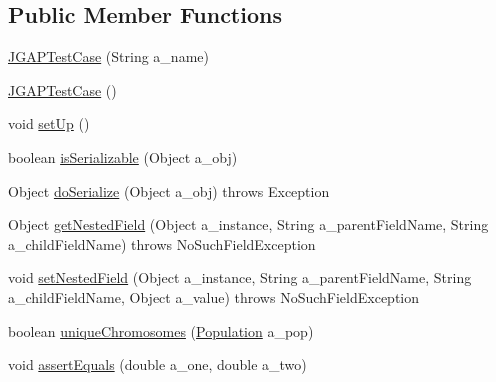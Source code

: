 \subsection*{Public Member Functions}
\begin{DoxyCompactItemize}
\item 
\hyperlink{classorg_1_1jgap_1_1_j_g_a_p_test_case_adf378e0444b264c507f8cc459d8a26ee}{J\-G\-A\-P\-Test\-Case} (String a\-\_\-name)
\item 
\hyperlink{classorg_1_1jgap_1_1_j_g_a_p_test_case_a472f2e2903439a8a484ba5ff0639fa02}{J\-G\-A\-P\-Test\-Case} ()
\item 
void \hyperlink{classorg_1_1jgap_1_1_j_g_a_p_test_case_a7278f46bafa651d39a1d301f6edacece}{set\-Up} ()
\item 
boolean \hyperlink{classorg_1_1jgap_1_1_j_g_a_p_test_case_a29296ff97e1d62bc9fd84f8571d3e654}{is\-Serializable} (Object a\-\_\-obj)
\item 
Object \hyperlink{classorg_1_1jgap_1_1_j_g_a_p_test_case_ac979f355528f40c594bf83535f3925b8}{do\-Serialize} (Object a\-\_\-obj)  throws Exception 
\item 
Object \hyperlink{classorg_1_1jgap_1_1_j_g_a_p_test_case_a1068930066ebd33ed69ccfe34a7f78ed}{get\-Nested\-Field} (Object a\-\_\-instance, String a\-\_\-parent\-Field\-Name, String a\-\_\-child\-Field\-Name)  throws No\-Such\-Field\-Exception 
\item 
void \hyperlink{classorg_1_1jgap_1_1_j_g_a_p_test_case_a77399f44cc0bd6e5ac3832e0ad2b2f7e}{set\-Nested\-Field} (Object a\-\_\-instance, String a\-\_\-parent\-Field\-Name, String a\-\_\-child\-Field\-Name, Object a\-\_\-value)  throws No\-Such\-Field\-Exception 
\item 
boolean \hyperlink{classorg_1_1jgap_1_1_j_g_a_p_test_case_a653121052ecd3600acbcabf78dc1e193}{unique\-Chromosomes} (\hyperlink{classorg_1_1jgap_1_1_population}{Population} a\-\_\-pop)
\item 
void \hyperlink{classorg_1_1jgap_1_1_j_g_a_p_test_case_a55e45761cdd59a4489404bb7aa775b79}{assert\-Equals} (double a\-\_\-one, double a\-\_\-two)
\end{DoxyCompactItemize}
